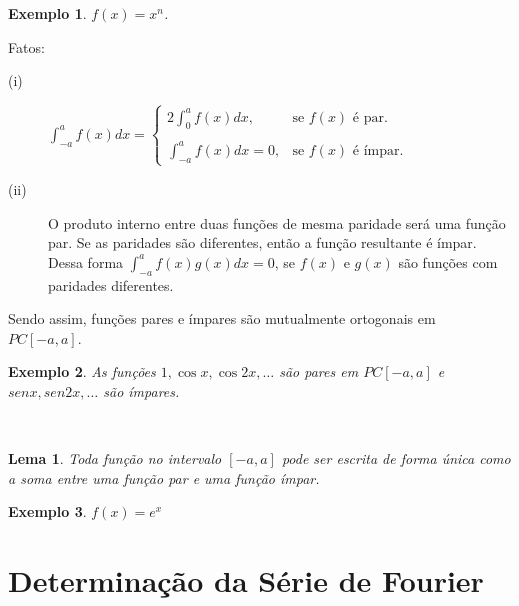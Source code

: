 \documentclass[a4paper,portuguese,9pt,final]{extarticle}
\newtheorem{lema}{Lema}[section]
\newtheorem{example}{Exemplo}[section]
\providecommand{\sin}{} \renewcommand{\sin}{sen}
\begin{document}
\begin{multicols*}{2}
        \begin{example}	
            $f(x) = x^n$.
        \end{example}


        Fatos:
        \begin{description}
            \item[(i)]  $\displaystyle\int_{-a}^{a} f(x)dx = \begin{cases}
            
                        \displaystyle2\int_{0}^{a}f(x)dx, & \mbox{se } f(x) \mbox{ é par. } \\ \\
            
                        \displaystyle \int_{-a}^{a}f(x)dx=0, & \mbox{se } f(x) \mbox{ é ímpar. }
            
                        \end{cases}$
            
            \item[(ii)] O produto interno entre duas funções de mesma paridade será uma função par. Se as paridades são diferentes, então a função resultante é ímpar. Dessa forma $ \displaystyle \int_{-a}^{a}f(x)g(x)dx=0 $, se $f(x)$ e $g(x)$ são funções com paridades diferentes.
        \end{description}


        Sendo assim, funções pares e ímpares são mutualmente ortogonais em $ PC[-a,a]. $ 

        \begin{example}
            As funções $1, \cos{x}, \cos{2x}, \ldots$ são pares em $PC[-a,a]$ e $\sin{x}, \sin{2x}, \ldots$ são ímpares.
        \end{example}\

        \begin{lema}	
            
            Toda função no intervalo $[-a,a]$ pode ser escrita de forma única como a soma entre uma função par e uma função ímpar.
        \end{lema}

        \begin{example}	
            $f(x) = e^x$
        \end{example}

    \section{Determinação da Série de Fourier}


\end{multicols*}
\end{document}
